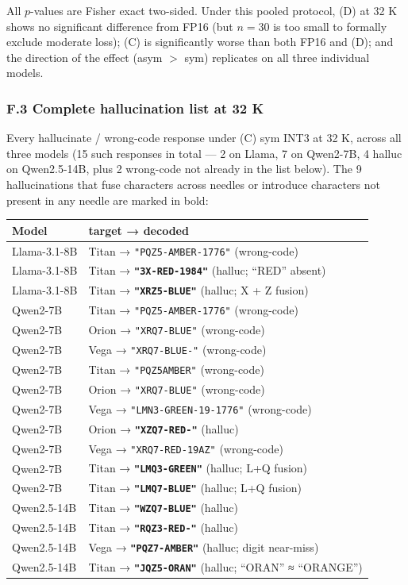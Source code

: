 \documentclass[
]{article}
\newcounter{none} %
\begin{document}
All \(p\)-values are Fisher exact two-sided. Under this pooled protocol,
(D) at 32 K shows no significant difference from FP16 (but \(n = 30\) is
too small to formally exclude moderate loss); (C) is significantly worse
than both FP16 and (D); and the direction of the effect (asym \(>\) sym)
replicates on all three individual models.

\subsubsection{F.3 Complete hallucination list at 32
K}\label{f.3-complete-hallucination-list-at-32-k}

Every hallucinate / wrong-code response under (C) sym INT3 at 32 K,
across all three models (15 such responses in total --- 2 on Llama, 7 on
Qwen2-7B, 4 halluc on Qwen2.5-14B, plus 2 wrong-code not already in the
list below). The 9 hallucinations that fuse characters across needles or
introduce characters not present in any needle are marked in bold:

{\def\LTcaptype{none} %
\begin{longtable}[]{@{}ll@{}}
\toprule\noalign{}
Model & target → decoded \\
\midrule\noalign{}
\endhead
\bottomrule\noalign{}
\endlastfoot
Llama-3.1-8B & Titan → \texttt{"PQZ5-AMBER-1776"} (wrong-code) \\
Llama-3.1-8B & Titan → \textbf{\texttt{"3X-RED-1984"}} (halluc; ``RED''
absent) \\
Llama-3.1-8B & Titan → \textbf{\texttt{"XRZ5-BLUE"}} (halluc; X + Z
fusion) \\
Qwen2-7B & Titan → \texttt{"PQZ5-AMBER-1776"} (wrong-code) \\
Qwen2-7B & Orion → \texttt{"XRQ7-BLUE"} (wrong-code) \\
Qwen2-7B & Vega → \texttt{"XRQ7-BLUE-"} (wrong-code) \\
Qwen2-7B & Titan → \texttt{"PQZ5AMBER"} (wrong-code) \\
Qwen2-7B & Orion → \texttt{"XRQ7-BLUE"} (wrong-code) \\
Qwen2-7B & Vega → \texttt{"LMN3-GREEN-19-1776"} (wrong-code) \\
Qwen2-7B & Orion → \textbf{\texttt{"XZQ7-RED-"}} (halluc) \\
Qwen2-7B & Vega → \texttt{"XRQ7-RED-19AZ"} (wrong-code) \\
Qwen2-7B & Titan → \textbf{\texttt{"LMQ3-GREEN"}} (halluc; L+Q
fusion) \\
Qwen2-7B & Titan → \textbf{\texttt{"LMQ7-BLUE"}} (halluc; L+Q fusion) \\
Qwen2.5-14B & Titan → \textbf{\texttt{"WZQ7-BLUE"}} (halluc) \\
Qwen2.5-14B & Titan → \textbf{\texttt{"RQZ3-RED-"}} (halluc) \\
Qwen2.5-14B & Vega → \textbf{\texttt{"PQZ7-AMBER"}} (halluc; digit
near-miss) \\
Qwen2.5-14B & Titan → \textbf{\texttt{"JQZ5-ORAN"}} (halluc; ``ORAN'' ≈
``ORANGE'') \\
\end{longtable}
}
\end{document}
